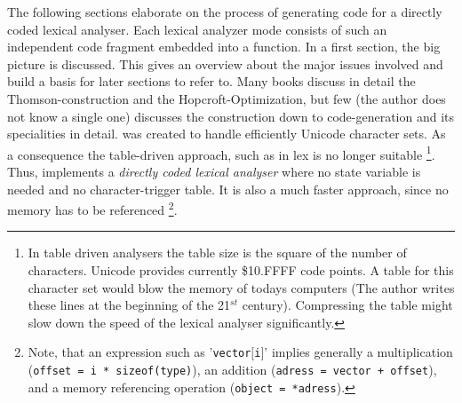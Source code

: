 The following sections elaborate on the process of generating code for a directly coded lexical
analyser. Each lexical analyzer mode consists of such an independent
code fragment embedded into a function. In a first section, the big picture is
discussed. This gives an overview about the major issues involved and build a
basis for later sections to refer to. Many books discuss in detail the
Thomson-construction and the Hopcroft-Optimization, but few (the author does
	not know a single one) discusses the construction down to
code-generation and its specialities in detail. {\Quex} was created to handle
efficiently Unicode character sets. As a consequence the table-driven approach,
	    such as in lex \cite{} is no longer suitable%
\footnote{In table driven analysers the table size is the square of the number
    of characters. Unicode provides currently \$10.FFFF code points. A table
	for this character set would blow the memory of todays computers (The
		author writes these lines at the beginning of the 21$^{st}$
		century).  Compressing the table might slow down the speed of
	    the lexical analyser significantly.}.
Thus, {\quex} implements a {\it directly coded lexical analyser} where no state
variable is needed and no character-trigger table. It is also a much faster
approach, since no memory has to be referenced%
\footnote{Note, that an expression such as '{\tt vector$[$i$]$}' implies
    generally a multiplication ({\tt offset = i * sizeof(type)}), an addition
	({\tt adress = vector + offset}), and a memory referencing  operation
	({\tt object = *adress}).}.

